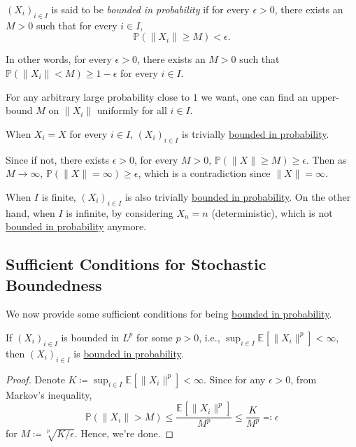 \begin{definition}\label{def:bounded-in-probability}
	\((X_i)_{i \in I}\) is said to be \emph{bounded in probability} if for every \(\epsilon > 0\), there exists an \(M > 0\) such that for every \(i \in I\),
	\[
		\mathbb{P} (\lVert X_i \rVert \geq M) < \epsilon .
	\]
\end{definition}

In other words, for every \(\epsilon > 0\), there exists an \(M > 0\) such that \(\mathbb{P} (\lVert X_i \rVert < M) \geq 1 - \epsilon\) for every \(i \in I\).

\begin{intuition}
	For any arbitrary large probability close to \(1\) we want, one can find an upper-bound \(M\) on \(\lVert X_i \rVert \) uniformly for all \(i \in I\).
\end{intuition}

\begin{note}
	When \(X_i = X\) for every \(i \in I\), \((X_i)_{i \in I}\) is trivially \hyperref[def:bounded-in-probability]{bounded in probability}.
\end{note}
\begin{explanation}
	Since if not, there exists \(\epsilon > 0\), for every \(M > 0\), \(\mathbb{P} (\lVert X \rVert \geq M) \geq \epsilon \). Then as \(M \to \infty \), \(\mathbb{P} (\lVert X \rVert = \infty ) \geq \epsilon \), which is a contradiction since \(\lVert X \rVert = \infty \).
\end{explanation}

\begin{remark}
	When \(I\) is finite, \((X_i)_{i \in I}\) is also trivially \hyperref[def:bounded-in-probability]{bounded in probability}. On the other hand, when \(I\) is infinite, by considering \(X_n = n\) (deterministic), which is not \hyperref[def:bounded-in-probability]{bounded in probability} anymore.
\end{remark}

\subsection{Sufficient Conditions for Stochastic Boundedness}
We now provide some sufficient conditions for being \hyperref[def:bounded-in-probability]{bounded in probability}.

\begin{proposition}
	If \((X_i)_{i \in I}\) is bounded in \(L^p\) for some \(p > 0\), i.e., \(\sup _{i \in I} \mathbb{E}_{}\left[\lVert X_i \rVert ^p \right] < \infty \), then \((X_i)_{i \in I}\) is \hyperref[def:bounded-in-probability]{bounded in probability}.
\end{proposition}
\begin{proof}
	Denote \(K \coloneqq \sup _{i \in I} \mathbb{E}_{}\left[\lVert X_i \rVert ^p \right] < \infty\). Since for any \(\epsilon > 0\), from Markov's inequality,
	\[
		\mathbb{P} (\lVert X_i \rVert > M)
		\leq \frac{\mathbb{E}_{}\left[\lVert X_i \rVert ^p \right] }{M^p}
		\leq \frac{K}{M^p}
		\eqqcolon \epsilon
	\]
	for \(M \coloneqq \sqrt[p]{K / \epsilon } \). Hence, we're done.
\end{proof}

